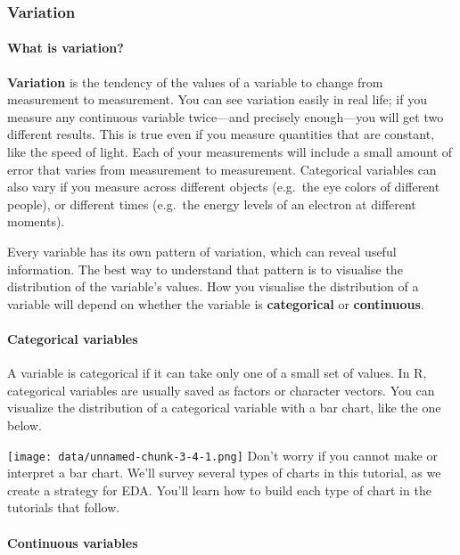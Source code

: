 \documentclass[
]{article}
\begin{document}
\hypertarget{variation}{%
\subsubsection{Variation}\label{variation}}

\hypertarget{what-is-variation}{%
\paragraph{What is variation?}\label{what-is-variation}}

\textbf{Variation} is the tendency of the values of a variable to change
from measurement to measurement. You can see variation easily in real
life; if you measure any continuous variable twice---and precisely
enough---you will get two different results. This is true even if you
measure quantities that are constant, like the speed of light. Each of
your measurements will include a small amount of error that varies from
measurement to measurement. Categorical variables can also vary if you
measure across different objects (e.g.~the eye colors of different
people), or different times (e.g.~the energy levels of an electron at
different moments).

Every variable has its own pattern of variation, which can reveal useful
information. The best way to understand that pattern is to visualise the
distribution of the variable's values. How you visualise the
distribution of a variable will depend on whether the variable is
\textbf{categorical} or \textbf{continuous}.

\hypertarget{categorical-variables}{%
\paragraph{Categorical variables}\label{categorical-variables}}

A variable is categorical if it can take only one of a small set of
values. In R, categorical variables are usually saved as factors or
character vectors. You can visualize the distribution of a categorical
variable with a bar chart, like the one below.

\texttt{[image: data/unnamed-chunk-3-4-1.png]} Don't worry if you cannot
make or interpret a bar chart. We'll survey several types of charts in
this tutorial, as we create a strategy for EDA. You'll learn how to
build each type of chart in the tutorials that follow.

\hypertarget{continuous-variables}{%
\paragraph{Continuous variables}\label{continuous-variables}}
\end{document}
